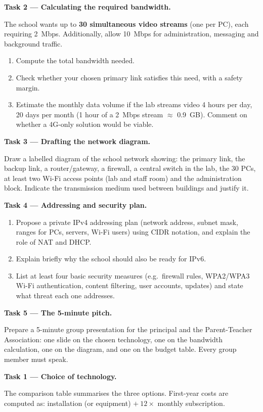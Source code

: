 \documentclass[11pt]{article}
\newcounter{popsec}
\newcounter{popsub}
\newcommand{\courssub}[1]{%
  \stepcounter{popsub}%
  \par\vspace{9pt}\noindent{\popxbold\fontsize{11.5}{13}\selectfont\color{popink}{\color{poporange}\thepopsec.\thepopsub}\hspace{6pt}#1}\par\nopagebreak\vspace{4pt}
}
\begin{document}
\textbf{Task 2 — Calculating the required bandwidth.}\par
The school wants up to \textbf{30 simultaneous video streams} (one per PC), each requiring \SI{2}{Mbps}. Additionally, allow \SI{10}{Mbps} for administration, messaging and background traffic.
\begin{enumerate}
\item Compute the total bandwidth needed.
\item Check whether your chosen primary link satisfies this need, with a safety margin.
\item Estimate the monthly data volume if the lab streams video 4 hours per day, 20 days per month (1 hour of a \SI{2}{Mbps} stream $\approx$ \SI{0.9}{GB}). Comment on whether a 4G-only solution would be viable.
\end{enumerate}

\textbf{Task 3 — Drafting the network diagram.}\par
Draw a labelled diagram of the school network showing: the primary link, the backup link, a router/gateway, a firewall, a central switch in the lab, the 30 PCs, at least two Wi-Fi access points (lab and staff room) and the administration block. Indicate the transmission medium used between buildings and justify it.

\textbf{Task 4 — Addressing and security plan.}\par
\begin{enumerate}
\item Propose a private IPv4 addressing plan (network address, subnet mask, ranges for PCs, servers, Wi-Fi users) using CIDR notation, and explain the role of NAT and DHCP.
\item Explain briefly why the school should also be ready for IPv6.
\item List at least four basic security measures (e.g.\ firewall rules, WPA2/WPA3 Wi-Fi authentication, content filtering, user accounts, updates) and state what threat each one addresses.
\end{enumerate}

\textbf{Task 5 — The 5-minute pitch.}\par
Prepare a 5-minute group presentation for the principal and the Parent-Teacher Association: one slide on the chosen technology, one on the bandwidth calculation, one on the diagram, and one on the budget table. Every group member must speak.

\courssub{Model answer}

\textbf{Task 1 — Choice of technology.}\par
The comparison table summarises the three options. First-year costs are computed as: installation (or equipment) $+\ 12 \times$ monthly subscription.
\end{document}
